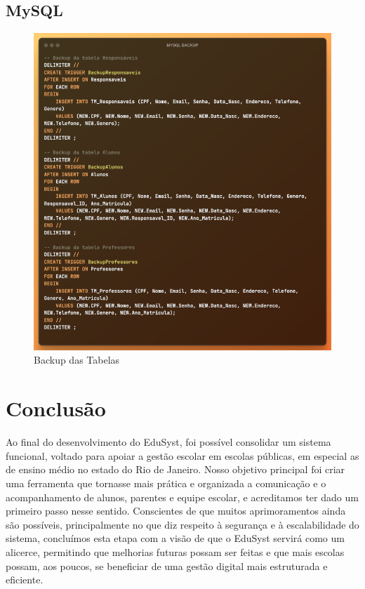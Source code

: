 \documentclass[main.tex]{subfiles}
\begin{document}
\subsection{MySQL}
\begin{figure}[H]
    \centering
    \includegraphics[scale=0.63]{imagens/code_scrs/1-mysql}
    \caption{Backup das Tabelas}
\end{figure}

\newpage
\section{Conclusão}
Ao final do desenvolvimento do EduSyst, foi possível consolidar um sistema funcional, voltado para apoiar a gestão escolar em escolas públicas, em especial as de ensino médio no estado do Rio de Janeiro. Nosso objetivo principal foi criar uma ferramenta que tornasse mais prática e organizada a comunicação e o acompanhamento de alunos, parentes e equipe escolar, e acreditamos ter dado um primeiro passo nesse sentido. Conscientes de que muitos aprimoramentos ainda são possíveis, principalmente no que diz respeito à segurança e à escalabilidade do sistema, concluímos esta etapa com a visão de que o EduSyst servirá como um alicerce, permitindo que melhorias futuras possam ser feitas e que mais escolas possam, aos poucos, se beneficiar de uma gestão digital mais estruturada e eficiente.
\end{document}
